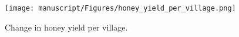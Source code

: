 \documentclass[12pt]{article}
\begin{document}
\begin{spacing}{2.0}
        \begin{figure}[hb!]
        \centering
      \texttt{[image: manuscript/Figures/honey\_yield\_per\_village.png]}
        \caption{Change in honey yield per village.}
        \label{fig:honey_yield_village}
        \end{figure} 

        

\end{spacing}

\clearpage

     
      
\end{document}
